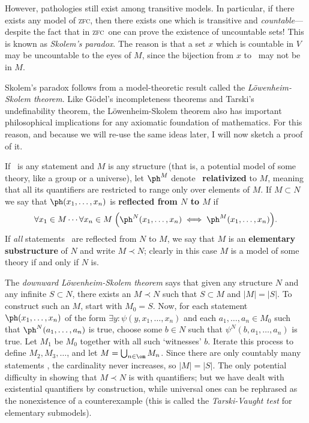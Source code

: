\documentclass{amsart}
\let\ee\prec
\def\zfc{\textsc{zfc}}
\begin{document}
However, pathologies still exist among transitive models.  In
particular, if there exists any model of \zfc, then there exists one
which is transitive and \emph{countable}---despite the fact that in
\zfc\ one can prove the existence of uncountable sets!  This is known
as \emph{Skolem's paradox}.  The reason is that a set $x$ which is
countable in $V$ may be uncountable to the eyes of $M$, since the
bijection from $x$ to \om\ may not be in $M$.

Skolem's paradox follows from a model-theoretic result called the
\emph{L\"owenheim-Skolem theorem}.  Like G\"odel's incompleteness
theorems and Tarski's undefinability theorem, the L\"owenheim-Skolem
theorem also has important philosophical implications for any
axiomatic foundation of mathematics.  For this reason, and because we
will re-use the same ideas later, I will now sketch a proof of it.

If \ph\ is any statement and $M$ is any structure (that is, a
potential model of some theory, like a group or a universe), let
$\ph^M$ denote \ph\ \textbf{relativized} to $M$, meaning that all its
quantifiers are restricted to range only over elements of $M$.  If
$M\subset N$ we say that $\ph(x_1,\dots,x_n)$ is \textbf{reflected
  from $N$ to $M$} if
\[\forall x_1\in M\cdots \forall x_n\in M \;\Big( \ph^N(x_1,\dots,x_n)
\iff \ph^M(x_1,\dots,x_n)\Big).
\]
If \emph{all} statements \ph\ are reflected from $N$ to $M$, we say
that $M$ is an \textbf{elementary substructure} of $N$ and write $M\ee
N$; clearly in this case $M$ is a model of some theory if and only if
$N$ is.

The \emph{downward L\"owenheim-Skolem theorem} says that given any
structure $N$ and any infinite $S\subset N$, there exists an $M\ee N$
such that $S\subset M$ and $|M| = |S|$.  To construct such an $M$,
start with $M_0=S$.  Now, for each statement $\ph(x_1,\dots,x_n)$ of
the form $\exists y: \psi(y,x_1,\dots,x_n)$ and each $a_1,\dots,a_n
\in M_0$ such that $\ph^N(a_1,\dots,a_n)$ is true, choose some $b\in
N$ such that $\psi^N(b,a_1,\dots,a_n)$ is true.  Let $M_1$ be $M_0$
together with all such `witnesses' $b$.  Iterate this process to
define $M_2,M_3,\dots$, and let $M=\bigcup_{n\in\om} M_n$.  Since
there are only countably many statements \ph, the cardinality never
increases, so $|M| = |S|$.  The only potential difficulty in showing
that $M\ee N$ is with quantifiers; but we have dealt with existential
quantifiers by construction, while universal ones can be rephrased as
the nonexistence of a counterexample (this is called the
\emph{Tarski-Vaught test} for elementary submodels).
\end{document}
